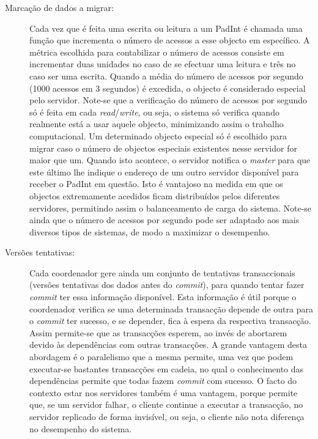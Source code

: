 \begin{description}
\item[Marcação de dados a migrar:]
Cada vez que é feita uma escrita ou leitura a um PadInt é chamada uma função que incrementa  o número de acessos a esse objecto em específico. A métrica escolhida para contabilizar o número de acessos consiste em incrementar duas unidades no caso de se efectuar uma leitura e três no caso ser uma escrita. Quando a média do número de acessos por segundo (1000 acessos em 3 segundos) é excedida, o objecto é considerado especial pelo servidor. Note-se que a verificação do número de acessos por segundo só é feita em cada \textit{read}/\textit{write}, ou seja, o sistema só verifica quando realmente está a usar aquele objecto, minimizando assim o trabalho computacional. Um determinado objecto especial só é escolhido para migrar caso o número de objectos especiais existentes nesse servidor for maior que um. Quando isto acontece, o servidor notifica o \textit{master} para que este último lhe indique o endereço de um outro servidor disponível para receber o PadInt em questão. Isto é vantajoso na medida em que os objectos extremamente acedidos ficam distribuídos pelos diferentes servidores, permitindo assim o balanceamento de carga do sistema. Note-se ainda que o número de acessos por segundo pode ser adaptado aos mais diversos tipos de sistemas, de modo a maximizar o desempenho.

\item[Versões tentativas:]

Cada coordenador gere ainda um conjunto de tentativas transaccionais (versões tentativas dos dados antes do \textit{commit}), para quando tentar fazer \textit{commit} ter essa informação disponível. Esta informação é útil porque o coordenador verifica se uma determinada transacção depende de outra para o \textit{commit} ter sucesso, e se depender, fica à espera da respectiva transacção. Assim permite-se que as transacções esperem, ao invés de abortarem devido às dependências com outras transacções. A grande vantagem desta abordagem é o paralelismo que a mesma permite, uma vez que podem executar-se bastantes transacções em cadeia, no qual o conhecimento das dependências permite que todas fazem \textit{commit} com sucesso. O facto do contexto estar nos servidores também é uma vantagem, porque permite que, se um servidor falhar, o cliente continue a executar a transacção, no servidor replicado de forma invisível, ou seja, o cliente não nota diferença no desempenho do sistema. 

\end{description}
